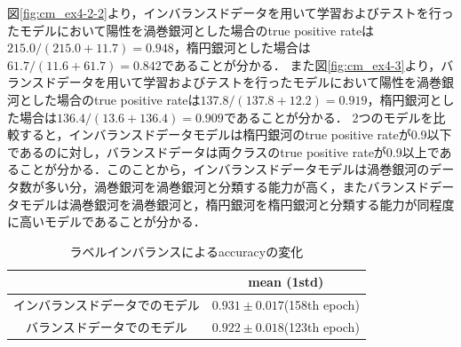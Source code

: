 \documentclass[a4j, 11pt]{jreport}
\begin{document}
図\ref{fig:cm_ex4-2-2}より，インバランスドデータを用いて学習およびテストを行ったモデルにおいて陽性を渦巻銀河とした場合のtrue positive rateは$215.0/(215.0+11.7) = 0.948$，楕円銀河とした場合は$61.7/(11.6+61.7) = 0.842$であることが分かる．
また図\ref{fig:cm_ex4-3}より，バランスドデータを用いて学習およびテストを行ったモデルにおいて陽性を渦巻銀河とした場合のtrue positive rateは$137.8/(137.8+12.2) = 0.919$，楕円銀河とした場合は$136.4/(13.6+136.4) = 0.909$であることが分かる．
2つのモデルを比較すると，インバランスドデータモデルは楕円銀河のtrue positive rateが0.9以下であるのに対し，バランスドデータは両クラスのtrue positive rateが0.9以上であることが分かる．このことから，インバランスドデータモデルは渦巻銀河のデータ数が多い分，渦巻銀河を渦巻銀河と分類する能力が高く，またバランスドデータモデルは渦巻銀河を渦巻銀河と，楕円銀河を楕円銀河と分類する能力が同程度に高いモデルであることが分かる．


\begin{table}[H]
  \centering
	\caption{ラベルインバランスによるaccuracyの変化}
  \begin{tabular}{|c|c|}
		\hline
    & mean (1std) \\ \hline
    インバランスドデータでのモデル & $0.931 \pm 0.017$(158th epoch) \\ \hline
    バランスドデータでのモデル & $0.922 \pm 0.018$(123th epoch) \\ \hline
  \end{tabular}
  \label{tb:accs_4.3}
\end{table}

\end{document}
